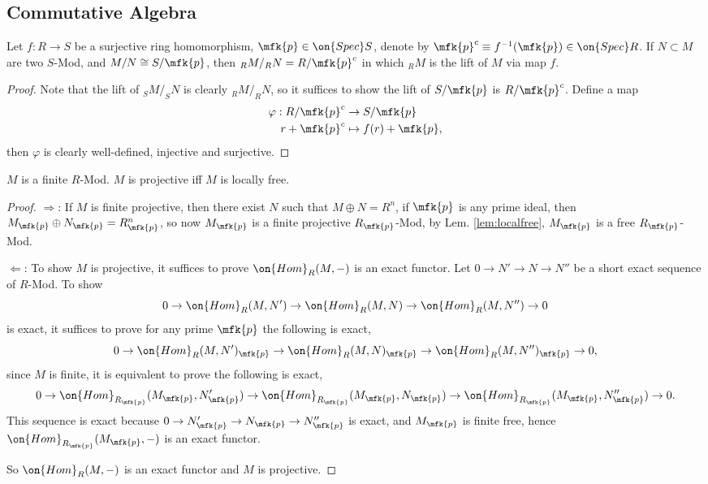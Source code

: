 \subsection{Commutative Algebra}
\begin{lem}\label{lem:lift}
	Let $f:R\rightarrow S$ be a surjective ring homomorphism, $\mfk{p}\in\on{Spec}S$, denote by $\mfk{p}^c\equiv f^{-1}(\mfk{p})\in\on{Spec}R$. If $N\subset M$ are two $S$-Mod, and $M/N\cong S/\mfk{p}$, then $_{R}M/_{R}N = R/\mfk{p}^c$ in which $_{R}M$ is the lift of $M$ via map $f$.
\end{lem}
\begin{proof}
	Note that the lift of $_{S}M/_{S}N$ is clearly $_{R}M/_{R}N$, so it suffices to show the lift of $S/\mfk{p}$ is $R/\mfk{p}^c$. Define a map
	\begin{equation*}
		\begin{split}
			\varphi:R/\mfk{p}^c&\rightarrow S/\mfk{p}\\
			r+\mfk{p}^c&\mapsto f(r)+\mfk{p},
		\end{split}
	\end{equation*}
	then $\varphi$ is clearly well-defined, injective and surjective.
\end{proof}

\begin{thm}\label{proj&lf}
	$M$ is a finite $R$-Mod. $M$ is projective iff $M$ is locally free.
\end{thm}
\begin{proof}
	$\Rightarrow$: If $M$ is finite projective, then there exist $N$ such that $M\oplus N=R^n$, if $\mfk{p}$ is any prime ideal, then $M_\mfk{p}\oplus N_\mfk{p}=R_\mfk{p}^n$, so now $M_\mfk{p}$ is a finite projective $R_\mfk{p}$-Mod, by Lem. \ref{lem:localfree}, $M_\mfk{p}$ is a free $R_\mfk{p}$-Mod.
	
	$\Leftarrow$: To show $M$ is projective, it suffices to prove $\on{Hom}_R(M,-)$ is an exact functor. Let $0\rightarrow N'\rightarrow N\rightarrow N''$ be a short exact sequence of $R$-Mod. To show
	$$
	0\rightarrow\on{Hom}_R(M,N')\rightarrow\on{Hom}_R(M,N)\rightarrow\on{Hom}_R(M,N'')\rightarrow 0
	$$
	is exact, it suffices to prove for any prime $\mfk{p}$ the following is exact,
	$$
	0\rightarrow\on{Hom}_R(M,N')_\mfk{p}\rightarrow\on{Hom}_R(M,N)_\mfk{p}\rightarrow\on{Hom}_R(M,N'')_\mfk{p}\rightarrow 0,
	$$
	since $M$ is finite, it is equivalent to prove the following is exact,
	$$
	0\rightarrow\on{Hom}_{R_\mfk{p}}(M_\mfk{p},N'_\mfk{p})\rightarrow\on{Hom}_{R_\mfk{p}}(M_\mfk{p},N_\mfk{p})\rightarrow\on{Hom}_{R_\mfk{p}}(M_\mfk{p},N''_\mfk{p})\rightarrow 0.
	$$
	This sequence is exact because $0\rightarrow N'_\mfk{p}\rightarrow N_\mfk{p}\rightarrow N''_\mfk{p}$ is exact, and $M_\mfk{p}$ is finite free, hence $\on{Hom}_{R_\mfk{p}}(M_\mfk{p},-)$ is an exact functor.
	
	So $\on{Hom}_R(M,-)$ is an exact functor and $M$ is projective.	
\end{proof}

